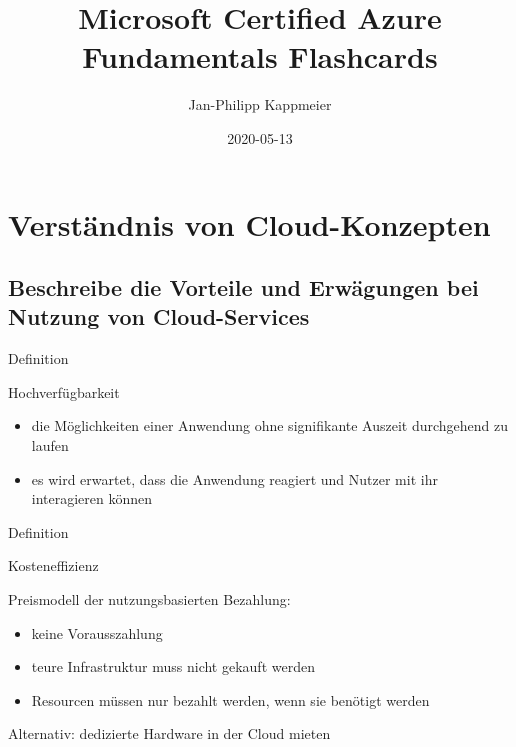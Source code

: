 \documentclass{scrartcl}
\newenvironment{flashcard}[2][]{%
    #1
    \vfill
    \centerline{\Large{#2}}
    \vfill
    \newpage
}
{\newpage}
\newcommand{\sectioncard}[1]{
    \vspace*{\stretch{1}}
    \section{#1}
    \vspace*{\stretch{1}}
    \pagebreak
}
\newcommand{\subsectioncard}[1]{
    \vspace*{\stretch{1}}
    \subsection{#1}
    \vspace*{\stretch{1}}
    \pagebreak
}
\begin{document}
    \title{Microsoft Certified Azure Fundamentals Flashcards}
    \date{2020-05-13}
    \author{Jan-Philipp Kappmeier}

    \clearpage\maketitle
    \thispagestyle{empty}
    \pagebreak

    \sectioncard{Verständnis von Cloud-Konzepten}

    \subsectioncard{Beschreibe die Vorteile und Erwägungen bei Nutzung von Cloud-Services}

    \begin{flashcard}[Definition]{Hochverfügbarkeit}
        \begin{itemize}
            \item die Möglichkeiten einer Anwendung ohne signifikante Auszeit durchgehend zu laufen
            \item es wird erwartet, dass die Anwendung reagiert und Nutzer mit ihr interagieren können
        \end{itemize}
    \end{flashcard}

    \begin{flashcard}[Definition]{Kosteneffizienz}
        Preismodell der nutzungsbasierten Bezahlung:
        \begin{itemize}
            \item keine Vorausszahlung
            \item teure Infrastruktur muss nicht gekauft werden
            \item Resourcen müssen nur bezahlt werden, wenn sie benötigt werden
        \end{itemize}

        \vspace{5mm}
        Alternativ: dedizierte Hardware in der Cloud mieten
    \end{flashcard}
\end{document}
